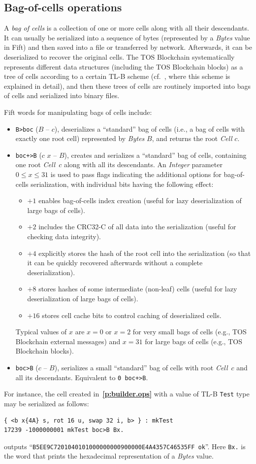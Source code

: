 \documentclass[12pt,oneside]{article}
\def\refpoint#1{{\rm\textbf{\ref{#1}}}}
\let\ptref=\refpoint
\def\mysubsection#1{\subsection{#1}\fancyhead[C]{\small{\textsc{\textrm{\thesubsection.} #1}}}}
\begin{document}
\mysubsection{Bag-of-cells operations}\label{p:boc.ops}
A {\em bag of cells\/} is a collection of one or more cells along with all their descendants. It can usually be serialized into a sequence of bytes (represented by a {\em Bytes\/} value in Fift) and then saved into a file or transferred by network. Afterwards, it can be deserialized to recover the original cells. The TOS Blockchain systematically represents different data structures (including the TOS Blockchain blocks) as a tree of cells according to a certain TL-B scheme (cf.~\cite{TBC}, where this scheme is explained in detail), and then these trees of cells are routinely imported into bags of cells and serialized into binary files.

Fift words for manipulating bags of cells include:
\begin{itemize}
\item {\tt B>boc} ($B$ -- $c$), deserializes a ``standard'' bag of cells (i.e., a bag of cells with exactly one root cell) represented by {\em Bytes} $B$, and returns the root {\em Cell\/} $c$.
\item {\tt boc+>B} ($c$ $x$ -- $B$), creates and serializes a ``standard'' bag of cells, containing one root {\em Cell\/}~$c$ along with all its descendants. An {\em Integer\/} parameter $0\leq x\leq 31$ is used to pass flags indicating the additional options for bag-of-cells serialization, with individual bits having the following effect:
  \begin{itemize}
  \item $+1$ enables bag-of-cells index creation (useful for lazy deserialization of large bags of cells).
  \item $+2$ includes the CRC32-C of all data into the serialization (useful for checking data integrity).
  \item $+4$ explicitly stores the hash of the root cell into the serialization (so that it can be quickly recovered afterwards without a complete deserialization).
  \item $+8$ stores hashes of some intermediate (non-leaf) cells (useful for lazy deserialization of large bags of cells).
  \item $+16$ stores cell cache bits to control caching of deserialized cells.
  \end{itemize}
Typical values of $x$ are $x=0$ or $x=2$ for very small bags of cells (e.g., TOS Blockchain external messages) and $x=31$ for large bags of cells (e.g., TOS Blockchain blocks).
\item {\tt boc>B} ($c$ -- $B$), serializes a small ``standard'' bag of cells with root {\em Cell\/}~$c$ and all its descendants. Equivalent to {\tt 0 boc+>B}.
\end{itemize}
For instance, the cell created in~\ptref{p:builder.ops} with a value of TL-B {\tt Test} type may be serialized as follows:
\begin{verbatim}
{ <b x{4A} s, rot 16 u, swap 32 i, b> } : mkTest
17239 -1000000001 mkTest boc>B Bx.
\end{verbatim}
outputs ``{\tt B5EE9C7201040101000000000900000E4A4357C46535FF ok}''. Here {\tt Bx.} is the word that prints the hexadecimal representation of a {\em Bytes} value.
\end{document}
